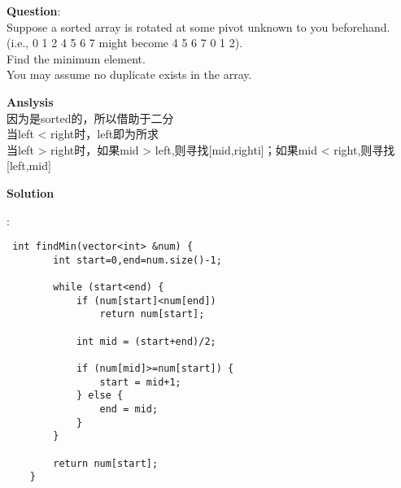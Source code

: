     
\begin{description}
    \item{\textbf{Question}}:\\%
		Suppose a sorted array is rotated at some pivot unknown to you beforehand.\\
		(i.e., 0 1 2 4 5 6 7 might become 4 5 6 7 0 1 2).\\
		Find the minimum element.\\
		You may assume no duplicate exists in the array.\\

    \item{\textbf{Anslysis}}\\
		因为是sorted的，所以借助于二分\\
		当left < right时，left即为所求\\
		当left > right时，如果mid > left,则寻找[mid,righti]；如果mid < right,则寻找[left,mid]\\

    \item{\textbf{Solution}}\\
	\item{} : \\
		\begin{lstlisting}
 int findMin(vector<int> &num) {
        int start=0,end=num.size()-1;

        while (start<end) {
            if (num[start]<num[end])
                return num[start];

            int mid = (start+end)/2;

            if (num[mid]>=num[start]) {
                start = mid+1;
            } else {
                end = mid;
            }
        }

        return num[start];
    }
		\end{lstlisting}

\end{description}

